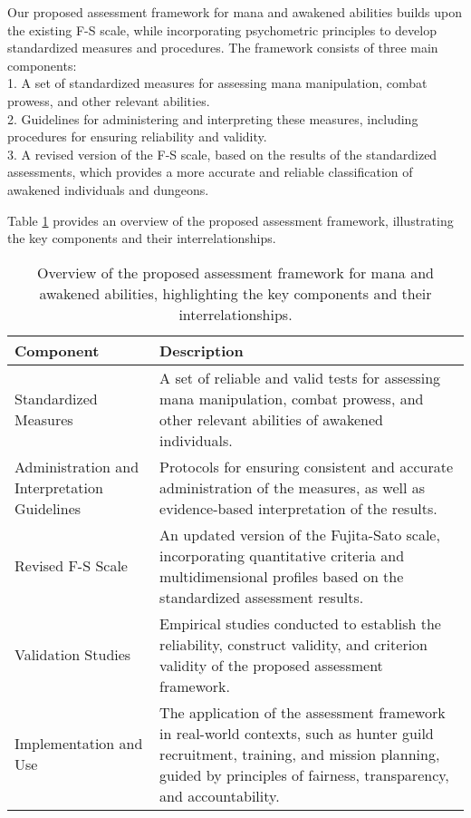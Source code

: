 \documentclass[12pt, a4paper]{article}
\begin{document}
Our proposed assessment framework for mana and awakened abilities builds upon the existing F-S scale, while incorporating psychometric principles to develop standardized measures and procedures. The framework consists of three main components:\\

1. A set of standardized measures for assessing mana manipulation, combat prowess, and other relevant abilities. \\
2. Guidelines for administering and interpreting these measures, including procedures for ensuring reliability and validity. \\
3. A revised version of the F-S scale, based on the results of the standardized assessments, which provides a more accurate and reliable classification of awakened individuals and dungeons.

Table \ref{fig:framework} provides an overview of the proposed assessment framework, illustrating the key components and their interrelationships.

\begin{table}[ht]
\centering
\begin{tabular}{|p{}|p{}|}
\hline
\textbf{Component} & \textbf{Description} \\
\hline
Standardized Measures & A set of reliable and valid tests for assessing mana manipulation, combat prowess, and other relevant abilities of awakened individuals. \\
\hline
Administration and Interpretation Guidelines & Protocols for ensuring consistent and accurate administration of the measures, as well as evidence-based interpretation of the results. \\
\hline
Revised F-S Scale & An updated version of the Fujita-Sato scale, incorporating quantitative criteria and multidimensional profiles based on the standardized assessment results. \\
\hline
Validation Studies & Empirical studies conducted to establish the reliability, construct validity, and criterion validity of the proposed assessment framework. \\
\hline
Implementation and Use & The application of the assessment framework in real-world contexts, such as hunter guild recruitment, training, and mission planning, guided by principles of fairness, transparency, and accountability. \\
\hline
\end{tabular}
\caption{Overview of the proposed assessment framework for mana and awakened abilities, highlighting the key components and their interrelationships.}
\label{fig:framework}
\end{table}
\end{document}
